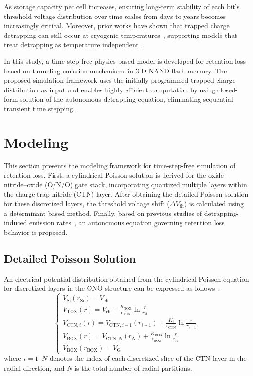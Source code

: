 \documentclass[journal,twoside,web]{ieeecolor}
\begin{document}
As storage capacity per cell increases, ensuring long-term stability of each bit’s threshold voltage distribution over time scales from days to years becomes increasingly critical.
Moreover, prior works have shown that trapped charge detrapping can still occur at cryogenic temperatures~\cite{Refaldi.IRPS2025,Refaldi.EDL2024}, supporting models that treat detrapping as temperature independent~\cite{Jin.TED2025}.

In this study, a time-step-free physics-based model is developed for retention loss based on tunneling emission mechanisms in 3-D NAND flash memory.
The proposed simulation framework uses the initially programmed trapped charge distribution as input and enables highly efficient computation by using closed-form solution of the autonomous detrapping equation, eliminating sequential transient time stepping.


\section{Modeling}

This section presents the modeling framework for time-step-free simulation of retention loss.
First, a cylindrical Poisson solution is derived for the oxide–nitride–oxide (O/N/O) gate stack, incorporating quantized multiple layers within the charge trap nitride (CTN) layer.
After obtaining the detailed Poisson solution for these discretized layers, the threshold voltage shift ($\Delta V_\mathrm{th}$) is calculated using a determinant based method.
Finally, based on previous studies of detrapping-induced emission rates~\cite{Jin.TED2025}, an autonomous equation governing retention loss behavior is proposed.

\subsection{Detailed Poisson Solution}

An electrical potential distribution obtained from the cylindrical Poisson equation for discretized layers in the ONO structure can be expressed as follows~\cite{Jin.TED2025,Amoroso.TED}.
\begin{equation}
\begin{cases}
V_\mathrm{Si}(r_\text{Si}) = V_\mathrm{ch} \\
V_\mathrm{TOX}(r) = V_\mathrm{ch} + \frac{K_\mathrm{TOX}}{\epsilon_\mathrm{TOX}}\ln{\frac{r}{r_\text{Si}}} \\
V_{\mathrm{CTN},i}(r) = V_{\mathrm{CTN},i-1} (r_{i-1}) + \frac{K_{i}}{\epsilon_\mathrm{CTN}} \ln{\frac{r}{r_{i-1}}} \\
V_\mathrm{BOX}(r) = V_{\mathrm{CTN},N} (r_{N}) + \frac{K_\mathrm{BOX}}{\epsilon_\mathrm{BOX}}\ln{\frac{r}{r_{N}}} \\
V_\mathrm{BOX}(r_\mathrm{BOX}) = V_\text{G}
\end{cases}
\end{equation}
\noindent where $i=1$–$N$ denotes the index of each discretized slice of the CTN layer in the radial direction, and $N$ is the total number of radial partitions.
\end{document}

